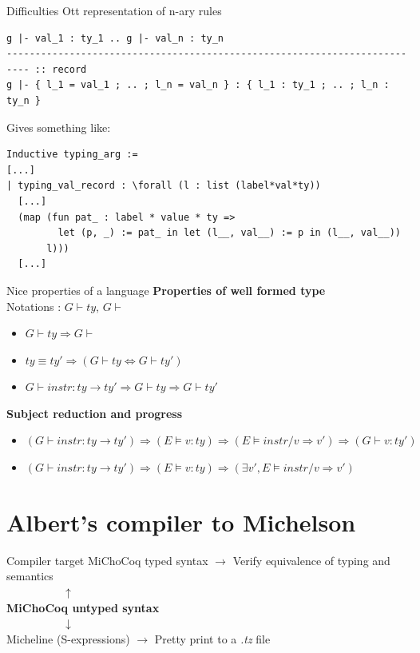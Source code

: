 \documentclass[aspectratio=169]{beamer}
\begin{document}
\begin{frame}[fragile]{Difficulties}
  Ott representation of n-ary rules
  {\footnotesize
\begin{verbatim}
g |- val_1 : ty_1 .. g |- val_n : ty_n
-------------------------------------------------------------------------- :: record
g |- { l_1 = val_1 ; .. ; l_n = val_n } : { l_1 : ty_1 ; .. ; l_n : ty_n }
\end{verbatim}}
Gives something like:
\begin{lstlisting}[language=Coq]
Inductive typing_arg :=
[...]
| typing_val_record : \forall (l : list (label*val*ty))
  [...]
  (map (fun pat_ : label * value * ty =>
         let (p, _) := pat_ in let (l__, val__) := p in (l__, val__))
       l)))
  [...]
\end{lstlisting}
\end{frame}

\begin{frame}{Nice properties of a language}
  \textbf{Properties of well formed type}\\
  Notations : $G \vdash ty$, $G \vdash$\\
  \begin{itemize}
    \item $G \vdash ty \Rightarrow G \vdash$
    \item $ty \equiv ty' \Rightarrow (G \vdash ty \Leftrightarrow G \vdash ty')$
    \item $G \vdash instr : ty \rightarrow ty' \Rightarrow G \vdash ty \Rightarrow G \vdash ty'$
  \end{itemize}

  \textbf{Subject reduction and progress}\\
  \begin{itemize}
    \item $(G \vdash instr : ty \rightarrow ty') \Rightarrow (E \models v : ty) \Rightarrow (E \models instr / v \Rightarrow v') \Rightarrow (G \vdash v : ty')$
    \item $(G \vdash instr : ty \rightarrow ty') \Rightarrow (E \models v : ty) \Rightarrow (\exists v', E \models instr / v \Rightarrow v')$
  \end{itemize}
\end{frame}

\section{Albert's compiler to Michelson}

\begin{frame}{Compiler target}
  MiChoCoq typed syntax $\rightarrow$ Verify equivalence of typing and semantics \\
  $\mspace{90mu} \uparrow $ \\
  \textbf{MiChoCoq untyped syntax} \\
  $\mspace{90mu} \downarrow $ \\
  Micheline (S-expressions) $\rightarrow$ Pretty print to a \textit{.tz} file
\end{frame}
\end{document}

